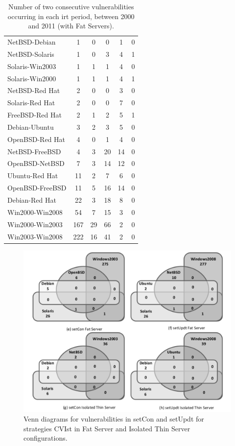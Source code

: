 \begin{table}[!ht]
\begin{center}
{\begin{tabular}{|l||c c c c c|}
NetBSD-Debian & 1 & 0 & 0 & 1 & 0 \\
NetBSD-Solaris & 1 & 0 & 3 & 4 & 1 \\
Solaris-Win2003 & 1 & 1 & 1 & 4 & 0 \\
Solaris-Win2000 & 1 & 1 & 1 & 4 & 1 \\
NetBSD-Red Hat & 2 & 0 & 0 & 3 & 0 \\
Solaris-Red Hat & 2 & 0 & 0 & 7 & 0\\
FreeBSD-Red Hat & 2 & 1 & 2 & 5 & 1\\
Debian-Ubuntu & 3 & 2 & 3 & 5 & 0\\
OpenBSD-Red Hat & 4 & 0 & 1 & 4 & 0\\
NetBSD-FreeBSD & 4 & 3 & 20 & 14 & 0 \\
OpenBSD-NetBSD & 7 & 3 & 14 & 12 & 0 \\
Ubuntu-Red Hat & 11 & 2 & 7 & 6 & 0 \\
OpenBSD-FreeBSD & 11 & 5 & 16 & 14 & 0 \\
Debian-Red Hat & 22 & 3 & 18 & 8 & 0 \\
Win2000-Win2008 & 54 & 7 & 15 & 3 & 0 \\
Win2000-Win2003 & 167 & 29 & 66 & 2 & 0 \\
Win2003-Win2008 & 222 & 16 & 41 & 2 & 0 \\ \hline
\end{tabular}
\caption{Number of two consecutive vulnerabilities occurring in each \gls{irt} period, between 2000 and 2011 (with Fat Servers).}
\label{tab:pairs_irt}
}
\end{center}
\end{table}

\begin{figure}[!ht]
 \centering
 \includegraphics[scale=0.7]{images/images/grayscale_ven_dia_one_fig_update_b.pdf}
 \caption{Venn diagrams for vulnerabilities in setCon and setUpdt for strategies CVIst in Fat Server and Isolated Thin Server configurations.}
 \label{fig-venn_b}
\end{figure}


